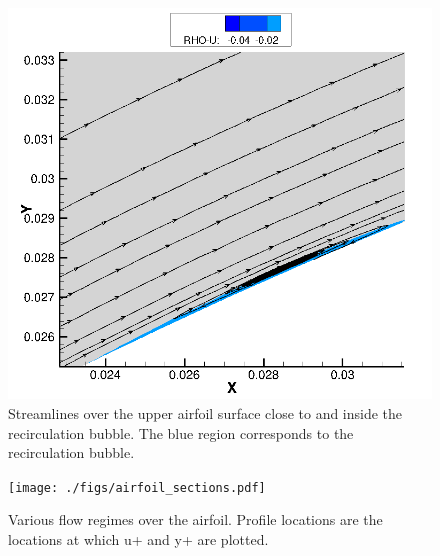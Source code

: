 \begin{figure}
    \centering
    \includegraphics[width=1.0\textwidth]{./figs/recirculation_upper.png}
    \caption{Streamlines over the upper airfoil surface close to and inside the
        recirculation bubble. The blue region corresponds to the recirculation
        bubble.}\label{fig:recirculation_upper}
\end{figure}

\begin{figure}
    \centering
    \texttt{[image: ./figs/airfoil\_sections.pdf]}
    \caption{Various flow regimes over the airfoil. Profile locations are the locations
        at which u+ and y+ are plotted.}\label{fig:airfoil_sections}
\end{figure}





